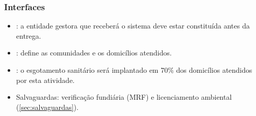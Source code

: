 
\subsubsection{Interfaces}

\begin{itemize}
  \item {}: a entidade gestora que receberá o sistema deve
        estar constituída antes da entrega.
  \item {}: define as comunidades e os domicílios atendidos.
  \item {}: o esgotamento sanitário será implantado em 70\%
        dos domicílios atendidos por esta atividade.
  \item Salvaguardas: verificação fundiária (MRF) e licenciamento ambiental
        (\autoref{sec:salvaguardas}).
\end{itemize}
